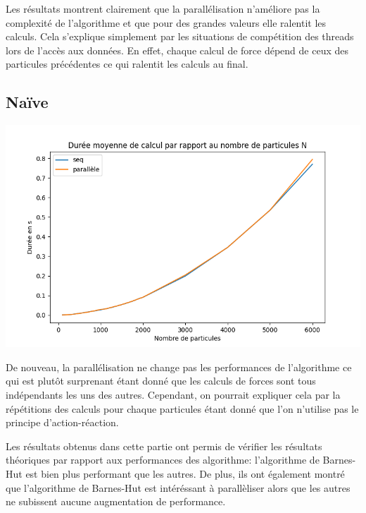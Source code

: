 Les résultats montrent clairement que la parallélisation n'améliore pas la complexité de l'algorithme et que pour des grandes valeurs elle ralentit les calculs.
Cela s'explique simplement par les situations de compétition des threads lors de l'accès aux données. En effet, chaque calcul de force dépend de ceux des particules précédentes ce qui ralentit les calculs au final.

\subsection{Naïve}
\begin{center}
\includegraphics[scale=0.6]{./resultats/comparison_N.png}
\label{figbh}
\end{center}

De nouveau, la parallélisation ne change pas les performances de l'algorithme ce qui est plutôt surprenant étant donné que les calculs de forces sont tous indépendants les uns des autres.
Cependant, on pourrait expliquer cela par la répétitions des calculs pour chaque particules étant donné que l'on n'utilise pas le principe d'action-réaction.

\vspace{2mm}

Les résultats obtenus dans cette partie ont permis de vérifier les résultats théoriques par rapport aux performances des algorithme: l'algorithme de Barnes-Hut est bien plus performant que les autres. De plus, ils ont également montré que l'algorithme de Barnes-Hut est intéréssant à parallèliser alors que les autres ne subissent aucune augmentation de performance.